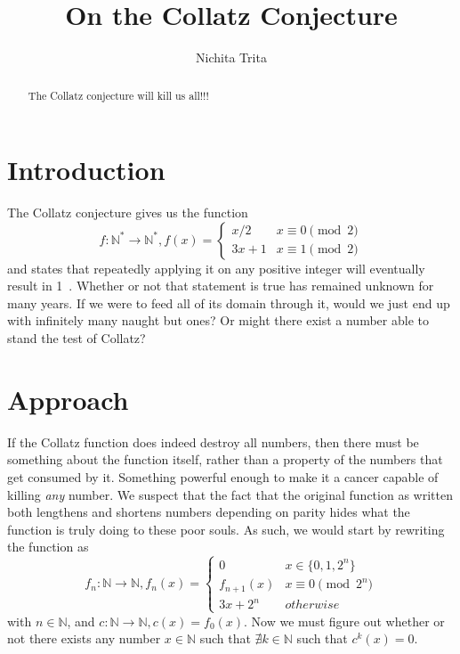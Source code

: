 \documentclass[10pt,a4paper,showpacs,nofootinbib,aps,superscriptaddress,eqsecnum,prd,showkeys,notitlepage]{article}
\author{Nichita Trita}
\title{On the Collatz Conjecture}
\begin{document}
\begin{abstract}
The Collatz conjecture will kill us all!!!
\end{abstract}

\maketitle
\section{Introduction}

The Collatz conjecture gives us the function 
\[f : \mathbb{N}^{*} \rightarrow \mathbb{N}^{*}, f(x) = 
\begin{cases}
	x / 2 & x\equiv 0 \pmod 2\\
	3x + 1 & x\equiv 1 \pmod 2
\end{cases}\] and states that repeatedly applying it on any positive integer will eventually result in 1~\cite{Lagarias}. Whether or not that statement is true has remained unknown for many years. If we were to feed all of its domain through it, would we just end up with infinitely many naught but ones? Or might there exist a number able to stand the test of Collatz?

\section{Approach}

If the Collatz function does indeed destroy all numbers, then there must be something about the function itself, rather than a property of the numbers that get consumed by it. Something powerful enough to make it a cancer capable of killing \textit{any} number.     
We suspect that the fact that the original function as written both lengthens and shortens numbers depending on parity hides what the function is truly doing to these poor souls. As such, we would start by rewriting the function as 
\[f_{n} : \mathbb{N} \rightarrow \mathbb{N}, 
f_{n}(x) = 
\begin{cases}
0 & x \in \{0, 1, 2^n\} \\
f_{n+1}(x) & x \equiv 0 \pmod {2^n} \\
3x + 2^n & otherwise
\end{cases}
\] with $n \in \mathbb{N}$, and \( c : \mathbb{N} \rightarrow \mathbb{N}, c(x) = f_0(x)\). Now we must figure out whether or not there exists any number $x \in \mathbb{N}$ such that $\nexists k \in \mathbb{N}$ such that $c^k(x) = 0$.
\end{document}

